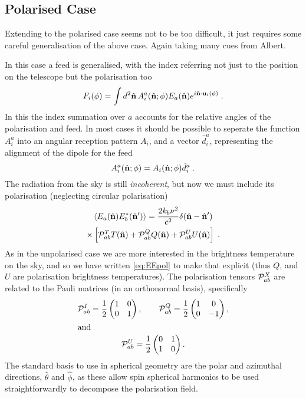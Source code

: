 \documentclass[prd,twocolumn,nofootinbib]{revtex4}
\begin{document}
\subsection{Polarised Case}

Extending to the polarised case seems not to be too difficult, it just requires
some careful generalisation of the above case. Again taking many cues from
Albert.

In this case a feed is generalised, with the index referring not just to the
position on the telescope but the polarisation too
\begin{equation}
  F_i(\phi) = \int d^2\hat{\mathbf{n}} \, A^a_i(\hat{\mathbf{n}}; \phi) E_a(\hat{\mathbf{n}}) e^{i
    \hat{\mathbf{n}}\cdot\mathbf{u}_i(\phi)}\; .
\end{equation}
In this the index summation over $a$ accounts for the relative angles of the
polarisation and feed. In most cases it should be possible to seperate the
function $A_i^a$ into an angular reception pattern $A_i$, and a vector
$\hat{d}_i^a$, representing the alignment of the dipole for the feed
\begin{equation}
  A_i^a(\hat{\mathbf{n}}; \phi) = A_i(\hat{\mathbf{n}}; \phi) \hat{d}^a_i \; .
\end{equation}
The radiation from the sky is still \emph{incoherent}, but now we must include
its polarisation (neglecting circular polarisation)
\begin{multline}
\label{eq:EEpol}
  \left\langle E_a(\hat{\mathbf{n}}) E_b^* (\hat{\mathbf{n}}') \right\rangle = \frac{2 k_b \nu^2}{c^2} \delta(\hat{\mathbf{n}} - \hat{\mathbf{n}}') \\ \times \left[\mathcal{P}_{ab}^T
    T(\hat{\mathbf{n}}) + \mathcal{P}_{ab}^Q Q(\hat{\mathbf{n}}) + \mathcal{P}_{ab}^U U(\hat{\mathbf{n}})\right] \; .
\end{multline}
As in the unpolarised case we are more interested in the brightness temperature
on the sky, and so we have written \eqref{eq:EEpol} to make that explicit (thus
$Q$, and $U$ are polarisation brightness temperatures). The polarisation tensors
$\mathcal{P}^X_{ab}$ are related to the Pauli matrices (in an orthonormal basis),
specifically
\begin{gather}
\mathcal{P}^I_{ab} = \frac{1}{2}\begin{pmatrix} 1 & 0 \\ 0 & 1\end{pmatrix},
\qquad
\mathcal{P}^Q_{ab} = \frac{1}{2}\begin{pmatrix} 1 & 0 \\ 0 & -1\end{pmatrix},
\\ \intertext{and}
\mathcal{P}^U_{ab} = \frac{1}{2}\begin{pmatrix} 0 & 1 \\ 1 & 0\end{pmatrix}.
\end{gather}
The standard basis to use in spherical geometry are the polar and azimuthal
directions, $\hat{\theta}$ and $\hat{\phi}$, as these allow spin spherical
harmonics to be used straightforwardly to decompose the polarisation field.
\end{document}

